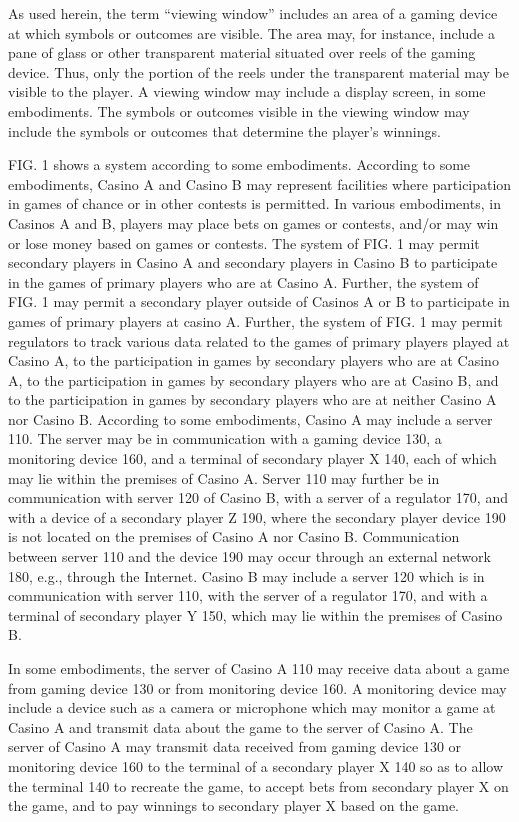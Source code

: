 \documentclass[11pt,a4paper]{article}
\begin{document}
As used herein, the term “viewing window” includes an area of a gaming device at which symbols or outcomes are visible. The area may, for instance, include a pane of glass or other transparent material situated over reels of the gaming device. Thus, only the portion of the reels under the transparent material may be visible to the player. A viewing window may include a display screen, in some embodiments. The symbols or outcomes visible in the viewing window may include the symbols or outcomes that determine the player's winnings.

FIG. 1 shows a system according to some embodiments. According to some embodiments, Casino A and Casino B may represent facilities where participation in games of chance or in other contests is permitted. In various embodiments, in Casinos A and B, players may place bets on games or contests, and/or may win or lose money based on games or contests. The system of FIG. 1 may permit secondary players in Casino A and secondary players in Casino B to participate in the games of primary players who are at Casino A. Further, the system of FIG. 1 may permit a secondary player outside of Casinos A or B to participate in games of primary players at casino A. Further, the system of FIG. 1 may permit regulators to track various data related to the games of primary players played at Casino A, to the participation in games by secondary players who are at Casino A, to the participation in games by secondary players who are at Casino B, and to the participation in games by secondary players who are at neither Casino A nor Casino B. According to some embodiments, Casino A may include a server 110. The server may be in communication with a gaming device 130, a monitoring device 160, and a terminal of secondary player X 140, each of which may lie within the premises of Casino A. Server 110 may further be in communication with server 120 of Casino B, with a server of a regulator 170, and with a device of a secondary player Z 190, where the secondary player device 190 is not located on the premises of Casino A nor Casino B. Communication between server 110 and the device 190 may occur through an external network 180, e.g., through the Internet. Casino B may include a server 120 which is in communication with server 110, with the server of a regulator 170, and with a terminal of secondary player Y 150, which may lie within the premises of Casino B.

In some embodiments, the server of Casino A 110 may receive data about a game from gaming device 130 or from monitoring device 160. A monitoring device may include a device such as a camera or microphone which may monitor a game at Casino A and transmit data about the game to the server of Casino A. The server of Casino A may transmit data received from gaming device 130 or monitoring device 160 to the terminal of a secondary player X 140 so as to allow the terminal 140 to recreate the game, to accept bets from secondary player X on the game, and to pay winnings to secondary player X based on the game.
\end{document}

